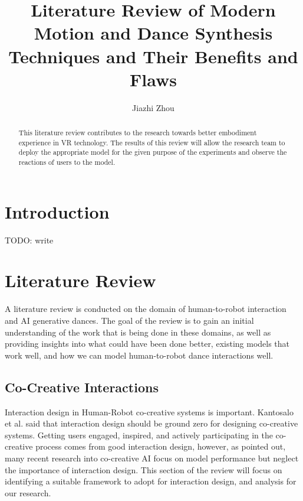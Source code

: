 \documentclass[final,5p,times,twocolumn,authoryear]{article}
\begin{document}
\title{Literature Review of Modern Motion and Dance Synthesis Techniques and Their Benefits and Flaws}
\author{Jiazhi Zhou}
\maketitle

\begin{abstract}

This literature review contributes to the research towards better embodiment experience in VR technology. The results of this review will allow the research team to deploy the appropriate model for the given purpose of the experiments and observe the reactions of users to the model.

\end{abstract}

\section{Introduction}

TODO: write

\section{Literature Review}

A literature review is conducted on the domain of human-to-robot
interaction and AI generative dances. The goal of the review is to gain
an initial understanding of the work that is being done in these
domains, as well as providing insights into what could have been done
better, existing models that work well, and how we can model
human-to-robot dance interactions well.

\subsection{Co-Creative Interactions}

Interaction design in Human-Robot co-creative systems is important.
Kantosalo et al. \cite{HUHUH} said that interaction design should be
ground zero for designing co-creative systems. Getting users engaged,
inspired, and actively participating in the co-creative process comes
from good interaction design, however, as \cite{Rezwana2023} pointed
out, many recent research into co-creative AI focus on model performance
but neglect the importance of interaction design. This section of the
review will focus on identifying a suitable framework to adopt for
interaction design, and analysis for our research.
\end{document}

